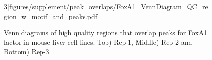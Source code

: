 \documentclass{article}
\begin{document}
\begin{figure}[H]
\begin{center}
3]{figures/supplement/peak_overlaps/FoxA1_VennDiagram_QC_region_w_motif_and_peaks.pdf}\\
\end{center}
\caption{Venn diagrams of high quality regions that overlap peaks for
  FoxA1 factor in mouse liver cell lines. Top) Rep-1, Middle) Rep-2
  and Bottom) Rep-3.}
\label{sfig:venn}
\end{figure}

\newpage










\end{document}
